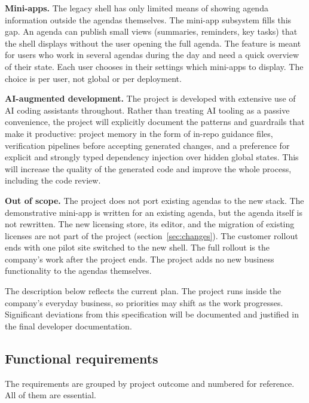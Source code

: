 \documentclass{article}
\begin{document}
\medskip
\noindent \textbf{Mini-apps.} The legacy shell has only limited means of showing agenda information outside the agendas themselves. The mini-app subsystem fills this gap. An agenda can publish small views (summaries, reminders, key tasks) that the shell displays without the user opening the full agenda. The feature is meant for users who work in several agendas during the day and need a quick overview of their state. Each user chooses in their settings which mini-apps to display. The choice is per user, not global or per deployment.

\medskip
\noindent \textbf{AI-augmented development.} The project is developed with extensive use of AI coding assistants throughout. Rather than treating AI tooling as a passive convenience, the project will explicitly document the patterns and guardrails that make it productive: project memory in the form of in-repo guidance files, verification pipelines before accepting generated changes, and a preference for explicit and strongly typed dependency injection over hidden global states. This will increase the quality of the generated code and improve the whole process, including the code review.

\medskip
\noindent \textbf{Out of scope.} The project does not port existing agendas to the new stack. The demonstrative mini-app is written for an existing agenda, but the agenda itself is not rewritten. The new licensing store, its editor, and the migration of existing licenses are not part of the project (section~\ref{sec:changes}). The customer rollout ends with one pilot site switched to the new shell. The full rollout is the company's work after the project ends. The project adds no new business functionality to the agendas themselves.

\medskip
The description below reflects the current plan. The project runs inside the company's everyday business, so priorities may shift as the work progresses. Significant deviations from this specification will be documented and justified in the final developer documentation.

\subsection{Functional requirements}
\label{sec:fr}

The requirements are grouped by project outcome and numbered for reference. All of them are essential.
\end{document}
